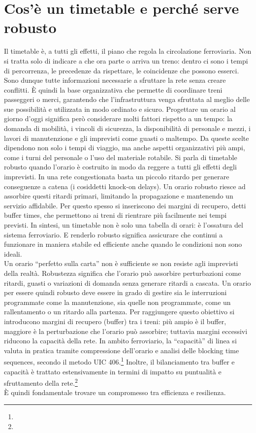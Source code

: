 \documentclass{report}
\newcommand{\fnShort}[2][]{\footnote{\footshorthand[#1]{#2}}}
\begin{document}
\section{Cos’è un timetable e perché serve robusto}
Il timetable è, a tutti gli effetti, il piano che regola la circolazione ferroviaria. Non si tratta solo di indicare a che ora parte o arriva un treno: dentro ci sono i tempi di percorrenza, le precedenze da rispettare, le coincidenze che possono esserci. Sono dunque tutte informazioni necessarie a sfruttare la rete senza creare conflitti. 
È quindi la base organizzativa che permette di coordinare treni passeggeri o merci, garantendo che l’infrastruttura venga sfruttata al meglio delle sue possibilità e utilizzata in modo ordinato e sicuro.
Progettare un orario al giorno d'oggi significa però considerare molti fattori rispetto a un tempo: la domanda di mobilità, i vincoli di sicurezza, la disponibilità di personale e mezzi, i lavori di manutenzione e gli imprevisti come guasti o maltempo. Da queste scelte dipendono non solo i tempi di viaggio, ma anche aspetti organizzativi più ampi, come i turni del personale o l’uso del materiale rotabile.
Si parla di timetable robusto quando l’orario è costruito in modo da reggere a tutti gli effetti degli imprevisti. In una rete congestionata basta un piccolo ritardo per generare conseguenze a catena (i cosiddetti knock-on delays). Un orario robusto riesce ad assorbire questi ritardi primari, limitando la propagazione e mantenendo un servizio affidabile. Per questo spesso si inseriscono dei margini di recupero, detti buffer times, che permettono ai treni di rientrare più facilmente nei tempi previsti.
In sintesi, un timetable non è solo una tabella di orari: è l’ossatura del sistema ferroviario. E renderlo robusto significa assicurare che continui a funzionare in maniera stabile ed efficiente anche quando le condizioni non sono ideali. \\
Un orario “perfetto sulla carta” non è sufficiente se non resiste agli imprevisti della realtà. Robustezza significa che l’orario può assorbire perturbazioni come ritardi, guasti o variazioni di domanda senza generare ritardi a cascata. Un orario per essere quindi robusto deve essere in grado di gestire sia le interruzioni programmate come la manutenzione, sia quelle non programmate, come un rallentamento o un ritardo alla partenza.
Per raggiungere questo obiettivo si introducono margini di recupero (buffer) tra i treni: più ampio è il buffer, maggiore è la perturbazione che l’orario può assorbire; tuttavia margini eccessivi riducono la capacità della rete. In ambito ferroviario, la “capacità” di linea si valuta in pratica tramite compressione dell’orario e analisi delle blocking time sequences, secondo il metodo UIC 406.\fnShort{UIC406} Inoltre, il bilanciamento tra buffer e capacità è trattato estensivamente in termini di impatto su puntualità e sfruttamento della rete.\fnShort{Dewilde2013} \\ È quindi fondamentale trovare un compromesso tra efficienza e resilienza. 
\end{document}
